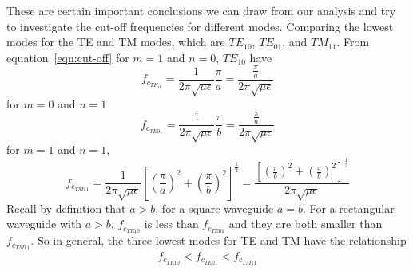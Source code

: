 These are certain important conclusions we can draw from our analysis and try to investigate the cut-off frequencies for different modes. Comparing the lowest modes for the TE and TM modes, which are $TE_{10}$, $TE_{01}$, and $TM_{11}$.
From equation~\ref{eqn:cut-off} for  $m=1$ and $n=0$, $TE_{10}$ have 
\begin{dmath*}
f_{c_{TE_{10}}} = \frac{1}{2\pi \sqrt{\mu\epsilon}}\frac{\pi}{a} = \frac{\frac{\pi}{a}}{2\pi \sqrt{\mu\epsilon}}
\end{dmath*}
for $m=0$ and $n=1$
\begin{dmath*}
f_{c_{TE{01}}} = \frac{1}{2\pi \sqrt{\mu\epsilon}}\frac{\pi}{b} = \frac{\frac{\pi}{a}}{2\pi \sqrt{\mu\epsilon}}
\end{dmath*}
for $m=1$ and $n=1$, 
\begin{dmath*} 
f_{c_{TM{11}}} = \frac{1}{2\pi \sqrt{\mu\epsilon}}\left[\left(\frac{\pi}{a}\right)^2 + \left(\dfrac{\pi}{b}\right)^2\right]^{\frac{1}{2}} = \frac{\left[\left(\frac{\pi}{b}\right)^2 + \left(\frac{\pi}{b}\right)^2\right]^{\frac{1}{2}}}{2\pi \sqrt{\mu\epsilon}}
\end{dmath*}
Recall by definition that $a>b$, for a square waveguide $a=b$. For a rectangular waveguide with $a>b$, $f_{c_{TE{10}}}$ is less than $f_{c_{TE{01}}}$ and they are both smaller than $f_{c_{TM{11}}}$. So in general, the three lowest modes for TE and TM have the relationship 
\begin{align*}
f_{c_{TE{10}}}<f_{c_{TE{01}}}<f_{c_{TM{11}}}
\end{align*}
